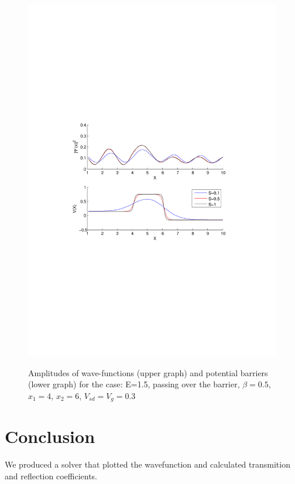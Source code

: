 \documentclass[•]{beamer}
\theoremstyle{remark}
\begin{document}
\begin{frame}
\begin{figure}
\centering
\caption{Amplitudes of wave-functions (upper graph) and potential barriers (lower graph) for the case: E=1.5, passing over the barrier, $\beta=0.5$, $x_1=4$, $x_2=6$, $V_{sd}=V_g=0.3$}
\includegraphics[scale=0.4, trim = 0mm 20mm 0mm 60mm, clip]{test3}
\label{fig:test3}
\end{figure}
\end{frame}

\section{Conclusion}
\begin{frame}
\begin{block}

We produced a solver that plotted the wavefunction and calculated transmition and reflection coefficients.
\end{block}
\end{frame}
\end{document}
